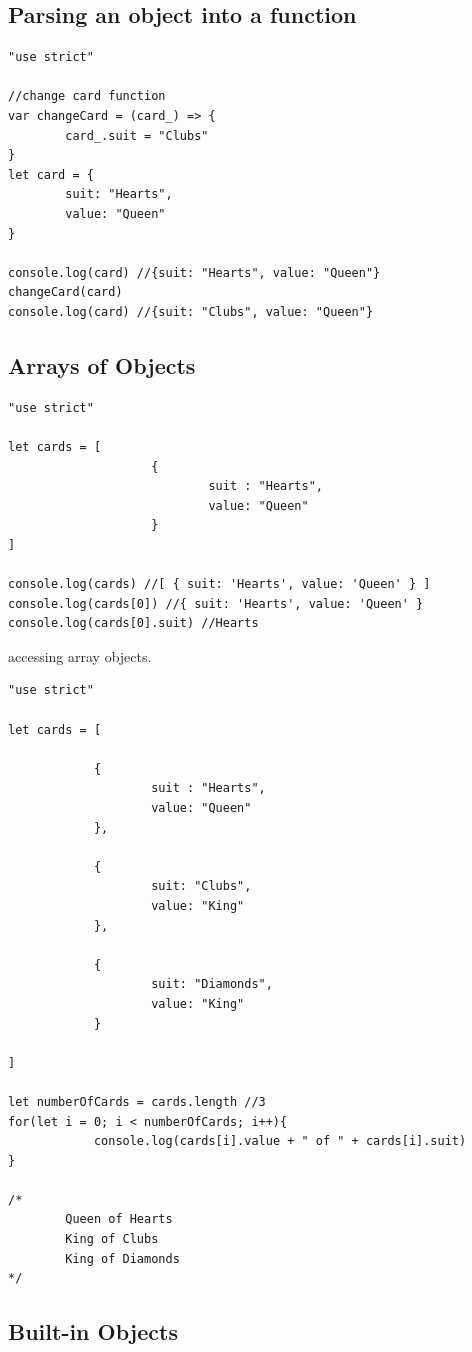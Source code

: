 \documentclass[10pt, a4paper, twocolumn]{article}
\begin{document}
\subsection{Parsing an object into a function}

\begin{lstlisting}
"use strict"

//change card function
var changeCard = (card_) => {
		card_.suit = "Clubs"
}
let card = {
		suit: "Hearts",
		value: "Queen"
}

console.log(card) //{suit: "Hearts", value: "Queen"}
changeCard(card)
console.log(card) //{suit: "Clubs", value: "Queen"}

\end{lstlisting}

\subsection{Arrays of Objects}

\begin{lstlisting}
"use strict"

let cards = [
					{
							suit : "Hearts",
							value: "Queen"
					}
]

console.log(cards) //[ { suit: 'Hearts', value: 'Queen' } ]
console.log(cards[0]) //{ suit: 'Hearts', value: 'Queen' }
console.log(cards[0].suit) //Hearts
\end{lstlisting}

accessing array objects.

\begin{lstlisting}
"use strict"

let cards = [

			{
					suit : "Hearts",
					value: "Queen"
			},

			{
					suit: "Clubs",
					value: "King"
			},

			{
					suit: "Diamonds",
					value: "King"
			}

]

let numberOfCards = cards.length //3
for(let i = 0; i < numberOfCards; i++){
			console.log(cards[i].value + " of " + cards[i].suit)
}

/*
		Queen of Hearts
		King of Clubs
		King of Diamonds
*/

\end{lstlisting}


\subsection{Built-in Objects}
\end{document}
